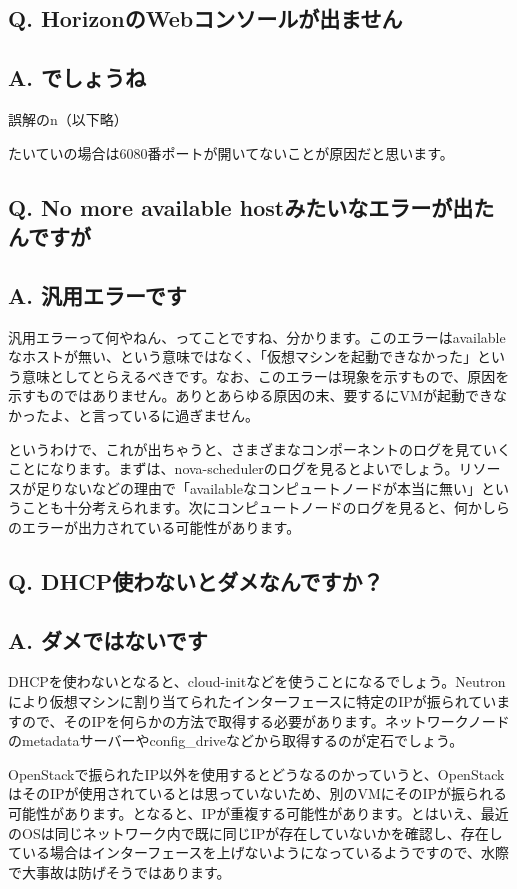 \documentclass[9pt,b5paper,tombo,openany]{jsbook}
\begin{document}
\subsection*{Q. HorizonのWebコンソールが出ません}
\subsection*{A. でしょうね}
誤解のn（以下略）

たいていの場合は6080番ポートが開いてないことが原因だと思います。

\subsection*{Q. No more available hostみたいなエラーが出たんですが}
\subsection*{A. 汎用エラーです}
汎用エラーって何やねん、ってことですね、分かります。このエラーはavailableなホストが無い、という意味ではなく、「仮想マシンを起動できなかった」という意味としてとらえるべきです。なお、このエラーは現象を示すもので、原因を示すものではありません。ありとあらゆる原因の末、要するにVMが起動できなかったよ、と言っているに過ぎません。

というわけで、これが出ちゃうと、さまざまなコンポーネントのログを見ていくことになります。まずは、nova-schedulerのログを見るとよいでしょう。リソースが足りないなどの理由で「availableなコンピュートノードが本当に無い」ということも十分考えられます。次にコンピュートノードのログを見ると、何かしらのエラーが出力されている可能性があります。

\subsection*{Q. DHCP使わないとダメなんですか？}
\subsection*{A. ダメではないです}
DHCPを使わないとなると、cloud-initなどを使うことになるでしょう。Neutronにより仮想マシンに割り当てられたインターフェースに特定のIPが振られていますので、そのIPを何らかの方法で取得する必要があります。ネットワークノードのmetadataサーバーやconfig\_driveなどから取得するのが定石でしょう。

OpenStackで振られたIP以外を使用するとどうなるのかっていうと、OpenStackはそのIPが使用されているとは思っていないため、別のVMにそのIPが振られる可能性があります。となると、IPが重複する可能性があります。とはいえ、最近のOSは同じネットワーク内で既に同じIPが存在していないかを確認し、存在している場合はインターフェースを上げないようになっているようですので、水際で大事故は防げそうではあります。
\end{document}

